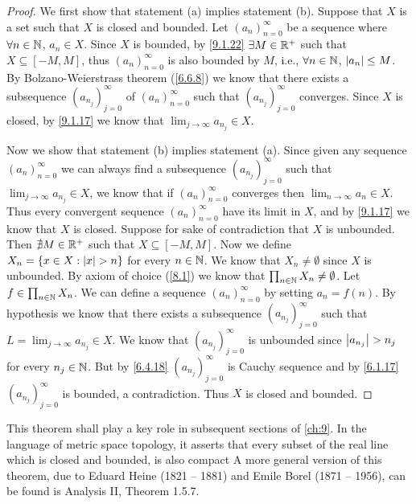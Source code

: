 \begin{proof}
	We first show that statement (a) implies statement (b).
	Suppose that \(X\) is a set such that \(X\) is closed and bounded.
	Let \((a_n)_{n = 0}^\infty\) be a sequence where \(\forall n \in \mathbb{N}\), \(a_n \in X\).
	Since \(X\) is bounded, by \cref{9.1.22} \(\exists M \in \mathbb{R}^+\) such that \(X \subseteq [-M, M]\), thus \((a_n)_{n = 0}^\infty\) is also bounded by \(M\), i.e., \(\forall n \in \mathbb{N}\), \(\left\lvert a_n\right\rvert \leq M\).
	By Bolzano-Weierstrass theorem (\cref{6.6.8}) we know that there exists a subsequence \((a_{n_j})_{j = 0}^\infty\) of \((a_n)_{n = 0}^\infty\) such that \((a_{n_j})_{j = 0}^\infty\) converges.
	Since \(X\) is closed, by \cref{9.1.17} we know that \(\lim_{j \to \infty} a_{n_j} \in X\).

	Now we show that statement (b) implies statement (a).
	Since given any sequence \((a_n)_{n = 0}^\infty\) we can always find a subsequence \((a_{n_j})_{j = 0}^\infty\) such that \(\lim_{j \to \infty} a_{n_j} \in X\), we know that if \((a_n)_{n = 0}^\infty\) converges then \(\lim_{n \to \infty} a_n \in X\).
	Thus every convergent sequence \((a_n)_{n = 0}^\infty\) have its limit in \(X\), and by \cref{9.1.17} we know that \(X\) is closed.
	Suppose for sake of contradiction that \(X\) is unbounded.
	Then \(\nexists M \in \mathbb{R}^+\) such that \(X \subseteq [-M, M]\).
	Now we define \(X_n = \left\lbrace x \in X : \left\lvert x\right\rvert > n\right\rbrace\) for every \(n \in \mathbb{N}\).
	We know that \(X_n \neq \emptyset\) since \(X\) is unbounded.
	By axiom of choice (\cref{8.1}) we know that \(\prod_{n \in \mathbb{N}} X_n \neq \emptyset\).
	Let \(f \in \prod_{n \in \mathbb{N}} X_n\).
	We can define a sequence \((a_n)_{n = 0}^\infty\) by setting \(a_n = f(n)\).
	By hypothesis we know that there exists a subsequence \((a_{n_j})_{j = 0}^\infty\) such that \(L = \lim_{j \to \infty} a_{n_j} \in X\).
	We know that \((a_{n_j})_{j = 0}^\infty\) is unbounded since \(\left\lvert a_{n_j}\right\rvert > n_j\) for every \(n_j \in \mathbb{N}\).
	But by \cref{6.4.18} \((a_{n_j})_{j = 0}^\infty\) is Cauchy sequence and by \cref{6.1.17} \((a_{n_j})_{j = 0}^\infty\) is bounded, a contradiction.
	Thus \(X\) is closed and bounded.
\end{proof}

\begin{rmk}\label{9.1.25}
	This theorem shall play a key role in subsequent sections of \cref{ch:9}.
	In the language of metric space topology, it asserts that every subset of the real line which is closed and bounded, is also compact
	A more general version of this theorem, due to Eduard Heine (1821 -- 1881) and Emile Borel (1871 -- 1956), can be found is Analysis II, Theorem 1.5.7.
\end{rmk}

